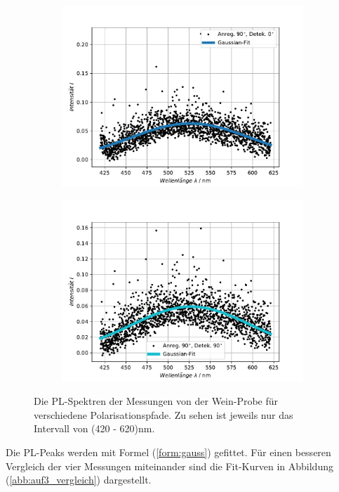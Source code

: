 \begin{figure}[hbtp]
\begin{subfigure}[t]{0.45\textwidth}
	\includegraphics[width=\textwidth]{Plots/aufgabe3_P3_korrek.pdf}
	\end{subfigure}
	\begin{subfigure}[t]{0.45\textwidth}
	\includegraphics[width=\textwidth]{Plots/aufgabe3_P4_korrek.pdf}
	\end{subfigure}
\caption{Die PL-Spektren der Messungen von der Wein-Probe f\"{u}r verschiedene Polarisationspfade. Zu sehen ist jeweils nur das Intervall von (420 - 620)nm.}
\label{abb:auf3}
\end{figure}
Die PL-Peaks werden mit Formel (\ref{form:gauss}) gefittet.
F\"{u}r einen besseren Vergleich der vier Messungen miteinander sind die Fit-Kurven in Abbildung (\ref{abb:auf3_vergleich}) dargestellt.
